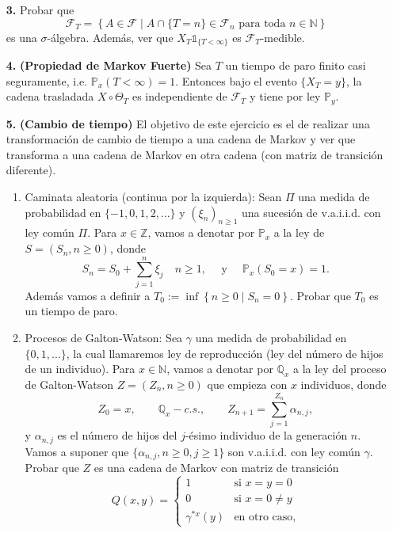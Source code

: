 \documentclass[letterpaper]{article}
\newcommand{\N}{\mathbb N}
\newcommand{\Z}{\mathbb Z}
\newcommand{\Q}{\mathbb{Q}}
\newcommand{\F}{\mathcal{F}}
\renewcommand{\P}{\mathbb{P}}
\newcommand{\1}{\mathds{1}}
\theoremstyle{definition}
\theoremstyle{definition}
\theoremstyle{definition}
\theoremstyle{definition}
\theoremstyle{definition}
\begin{document}
\begin{itemize}
    \item[\textbf{3.}] Probar que 
    \[
    \F_T=\left\{A\in\F \mid A\cap \{T=n\}\in \F_n \text{ para toda } n\in \N \right\}    
    \]
    es una $\sigma$-álgebra. Además, ver que $X_T\1_{\{T<\infty\}}$ es $\F_T$-medible.
    \item[\textbf{4.}] \textbf{(Propiedad de Markov Fuerte)} Sea $T$ un tiempo de paro finito 
    casi seguramente, i.e. $\P_x\left(T<\infty\right)=1$. Entonces bajo el evento $\{X_T=y\}$, la cadena trasladada 
    $X\circ\Theta_T$ es independiente de $\F_T$ y tiene por ley $\P_y$.
    \item[\textbf{5.}] \textbf{(Cambio de tiempo)} El objetivo de este ejercicio es el de 
    realizar una transformación de cambio de tiempo a una cadena de Markov y ver que transforma 
    a una cadena de Markov en otra cadena (con matriz de transición diferente).
    \begin{enumerate}
        \item Caminata aleatoria (continua por la izquierda): Sean $\Pi$ una medida de probabilidad
        en $\{-1,0,1,2,...\}$ y $(\xi_n)_{n\geq1}$ una sucesión de v.a.i.i.d. con ley común $\Pi$. Para $x\in \Z$, 
        vamos a denotar por $\P_x$ a la ley de $S=(S_n,n\geq0)$, donde 
        \[
            S_n=S_0+\sum_{j=1}^{n}\xi_j \quad n\geq1, \quad \text{ y } \quad \P_x(S_0=x)=1. 
        \]
        Además vamos a definir a $T_0:=\inf \left\{n\geq0 \mid S_n=0\right\}$. Probar que $T_0$ es un 
        tiempo de paro.
        \item Procesos de Galton-Watson: Sea $\gamma$ una medida de probabilidad en $\{0,1,...\}$, la cual 
        llamaremos ley de reproducción (ley del número de hijos de un individuo). Para $x\in \N$, vamos a denotar por 
        $\Q_x$ a la ley del proceso de Galton-Watson $Z=\left(Z_n,n\geq0\right)$ que empieza con $x$ individuos, 
        donde 
        \[
        Z_0=x, \qquad \Q_x-c.s., \qquad Z_{n+1}=\sum_{j=1}^{Z_n}\alpha_{n,j},    
        \]
        y $\alpha_{n,j}$ es el número de hijos del $j$-ésimo individuo de la generación $n$. 
        Vamos a suponer que $\{\alpha_{n,j},n\geq0,j\geq1\}$ son v.a.i.i.d. con ley común $\gamma$. Probar 
        que $Z$ es una cadena de Markov con matriz de transición 
        \[
        Q(x,y)=\begin{cases}
            1 & \text{si } x=y=0\\
            0 & \text{si } x=0\neq y\\
            \gamma^{*x}(y) & \text{en otro caso,}
        \end{cases}    
\]
\end{enumerate}
\end{itemize}
\end{document}
